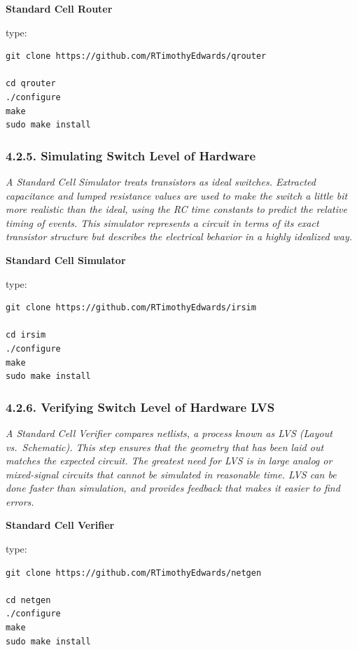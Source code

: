 \documentclass[
]{article}
\begin{document}
\textbf{Standard Cell Router}

type:

\begin{verbatim}
git clone https://github.com/RTimothyEdwards/qrouter

cd qrouter
./configure
make
sudo make install
\end{verbatim}

\hypertarget{simulating-switch-level-of-hardware}{%
\subsubsection{4.2.5. Simulating Switch Level of
Hardware}\label{simulating-switch-level-of-hardware}}

\emph{A Standard Cell Simulator treats transistors as ideal switches.
Extracted capacitance and lumped resistance values are used to make the
switch a little bit more realistic than the ideal, using the RC time
constants to predict the relative timing of events. This simulator
represents a circuit in terms of its exact transistor structure but
describes the electrical behavior in a highly idealized way.}

\textbf{Standard Cell Simulator}

type:

\begin{verbatim}
git clone https://github.com/RTimothyEdwards/irsim

cd irsim
./configure
make
sudo make install
\end{verbatim}

\hypertarget{verifying-switch-level-of-hardware-lvs}{%
\subsubsection{4.2.6. Verifying Switch Level of Hardware
LVS}\label{verifying-switch-level-of-hardware-lvs}}

\emph{A Standard Cell Verifier compares netlists, a process known as LVS
(Layout vs.~Schematic). This step ensures that the geometry that has
been laid out matches the expected circuit. The greatest need for LVS is
in large analog or mixed-signal circuits that cannot be simulated in
reasonable time. LVS can be done faster than simulation, and provides
feedback that makes it easier to find errors.}

\textbf{Standard Cell Verifier}

type:

\begin{verbatim}
git clone https://github.com/RTimothyEdwards/netgen

cd netgen
./configure
make
sudo make install
\end{verbatim}
\end{document}
